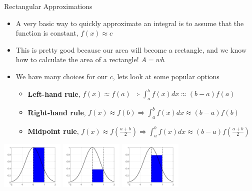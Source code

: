 {}\documentclass[letterpaper,
compress,
xcolor=x11names,
]{beamer}
\begin{document}

\begin{frame}{Rectangular Approximations}
	\footnotesize
	\begin{itemize}
		\item A very basic way to quickly approximate an  integral is to assume that the function is constant, $f(x) \approx c$
		\item This is  pretty good because our area will become a rectangle, and we know how to calculate the area of a rectangle! $A = wh$
		\item We have many choices for our $c$, lets look at some popular options
		\begin{itemize}
			\item \textbf{Left-hand rule}, $f(x)\approx f(a)\Rightarrow \displaystyle \int_{a}^{b}f(x)dx\approx (b-a)f(a)$
			\item \textbf{Right-hand rule}, $f(x)\approx f(b)\Rightarrow  \displaystyle \int_{a}^{b}f(x)dx\approx (b-a)f(b)$
			\item \textbf{Midpoint rule}, $f(x)\approx f(\frac{a+b}{2})\Rightarrow  \displaystyle \int_{a}^{b}f(x)dx\approx (b-a)f(\frac{a+b}{2})$
		\end{itemize}
	\end{itemize}
	\begin{center}
		\includegraphics[height = 2.25cm]{left_approx.png} \hspace{0.5cm}
		\includegraphics[height = 2.25cm]{right_approx.png} \hspace{0.5cm}
		\includegraphics[height = 2.25cm]{center_approx.png} 
	\end{center}
\end{frame}
\end{document}
